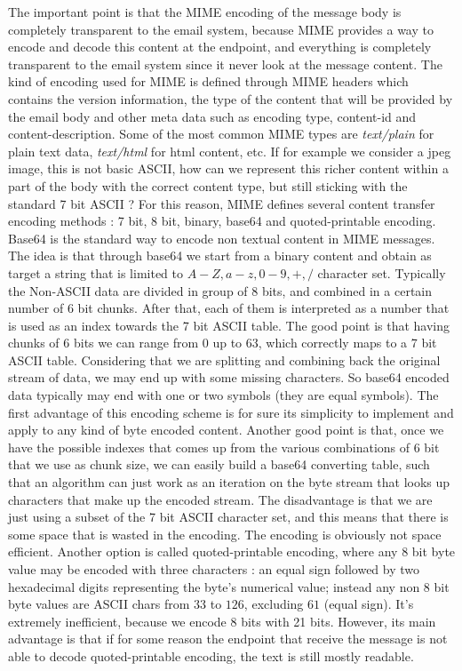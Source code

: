 The important point is that the MIME encoding of the message body is completely transparent to the email system, because MIME provides a way to encode and decode this content at the endpoint, and everything is completely transparent to the email system since it never look at the message content. The kind of encoding used for MIME is defined through MIME headers which contains the version information, the type of the content that will be provided by the email body and other meta data such as encoding type, content-id and content-description. Some of the most common MIME types are \textit{text/plain} for plain text data, \textit{text/html} for html content, etc. If for example we consider a jpeg image, this is not basic ASCII, how can we represent this richer content within a part of the body with the correct content type, but still sticking with the standard 7 bit ASCII ? For this reason, MIME defines several content transfer encoding methods : 7 bit, 8 bit, binary, base64 and quoted-printable encoding. Base64 is the standard way to encode non textual content in MIME messages. The idea is that through base64 we start from a binary content and obtain as target a string that is limited to $A-Z, a-z, 0-9,+, /$ character set. Typically the Non-ASCII data are divided in group of 8 bits, and combined in a certain number of 6 bit chunks. After that, each of them is interpreted as a number that is used as an index towards the 7 bit ASCII table. The good point is that having chunks of 6 bits we can range from $0$ up to $63$, which correctly maps to a 7 bit ASCII table. Considering that we are splitting and combining back the original stream of data, we may end up with some missing characters. So base64 encoded data typically may end with one or two symbols (they are equal symbols). The first advantage of this encoding scheme is for sure its simplicity to implement and apply to any kind of byte encoded content. Another good point is that, once we have the possible indexes that comes up from the various combinations of 6 bit that we use as chunk size, we can easily build a base64 converting table, such that an algorithm can just work as an iteration on the byte stream that looks up characters that make up the encoded stream. The disadvantage is that we are just using a subset of the 7 bit ASCII character set, and this means that there is some space that is wasted in the encoding. The encoding is obviously not space efficient. Another option is called quoted-printable encoding, where any 8 bit byte value may be encoded with three characters : an equal sign followed by two hexadecimal digits representing the byte's numerical value; instead any non 8 bit byte values are ASCII chars from $33$ to $126$, excluding $61$ (equal sign). It's extremely inefficient, because we encode 8 bits with 21 bits. However, its main advantage is that if for some reason the endpoint that receive the message is not able to decode quoted-printable encoding, the text is still mostly readable.
